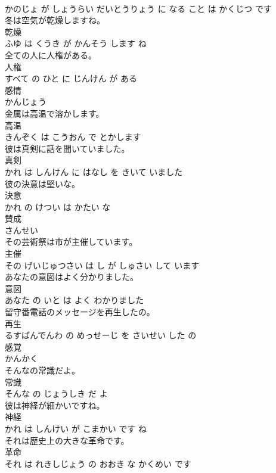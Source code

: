 \documentclass[8pt]{extreport}
\begin{document}
\begin{CJK}{UTF8}{min}
\\	かのじょ が しょうらい だいとうりょう に なる こと は かくじつ です		
\\	冬は空気が乾燥しますね。	
\\	乾燥 
\\	ふゆ は くうき が かんそう します ね		
\\	全ての人に人権がある。	
\\	人権 
\\	すべて の ひと に じんけん が ある		
\\	感情	
\\	かんじょう		
\\	金属は高温で溶かします。	
\\	高温 
\\	きんぞく は こうおん で とかします		
\\	彼は真剣に話を聞いていました。	
\\	真剣 
\\	かれ は しんけん に はなし を きいて いました		
\\	彼の決意は堅いな。	
\\	決意 
\\	かれ の けつい は かたい な		
\\	賛成	
\\	さんせい		
\\	その芸術祭は市が主催しています。	
\\	主催 
\\	その げいじゅつさい は し が しゅさい して います		
\\	あなたの意図はよく分かりました。	
\\	意図 
\\	あなた の いと は よく わかりました		
\\	留守番電話のメッセージを再生したの。	
\\	再生 
\\	るすばんでんわ の めっせーじ を さいせい した の		
\\	感覚	
\\	かんかく		
\\	そんなの常識だよ。	
\\	常識 
\\	そんな の じょうしき だ よ		
\\	彼は神経が細かいですね。	
\\	神経 
\\	かれ は しんけい が こまかい です ね		
\\	それは歴史上の大きな革命です。	
\\	革命 
\\	それ は れきしじょう の おおき な かくめい です		

\end{CJK}
\end{document}

